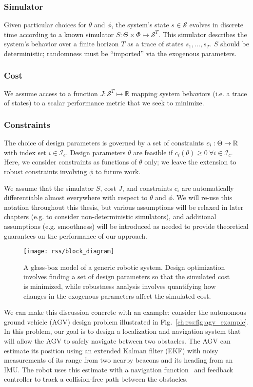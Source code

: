\subsubsection{Simulator} Given particular choices for $\theta$ and $\phi$, the system's state $s \in \mathcal{S}$ evolves in discrete time according to a known simulator $S : \Theta \times \Phi \mapsto \mathcal{S}^T$. This simulator describes the system's behavior over a finite horizon $T$ as a trace of states $s_1, \ldots, s_T$. $S$ should be deterministic; randomness must be ``imported'' via the exogenous parameters.
\subsubsection{Cost} We assume access to a function $J: \mathcal{S}^T \mapsto \mathbb{R}$ mapping system behaviors (i.e. a trace of states) to a scalar performance metric that we seek to minimize.
\subsubsection{Constraints} The choice of design parameters is governed by a set of constraints $c_i : \Theta \mapsto \mathbb{R}$ with index set $i \in \mathcal{I}_c$. Design parameters $\theta$ are feasible if $c_i(\theta) \geq 0 \ \forall i \in \mathcal{I}_c$. Here, we consider constraints as functions of $\theta$ only; we leave the extension to robust constraints involving $\phi$ to future work.

We assume that the simulator $S$, cost $J$, and constraints $c_i$ are automatically differentiable almost everywhere with respect to $\theta$ and $\phi$. We will re-use this notation throughout this thesis, but various assumptions will be relaxed in later chapters (e.g. to consider non-deterministic simulators), and additional assumptions (e.g. smoothness) will be introduced as needed to provide theoretical guarantees on the performance of our approach.

\begin{figure}[t!]
    \centering
    \texttt{[image: rss/block\_diagram]}
    \caption{A glass-box model of a generic robotic system. Design optimization involves finding a set of design parameters so that the simulated cost is minimized, while robustness analysis involves quantifying how changes in the exogenous parameters affect the simulated cost.}
    \label{ch:rss:fig:block_diagram}
\end{figure}

We can make this discussion concrete with an example: consider the autonomous ground vehicle (AGV) design problem illustrated in Fig.~\ref{ch:rss:fig:agv_example}. In this problem, our goal is to design a localization and navigation system that will allow the AGV to safely navigate between two obstacles. The AGV can estimate its position using an extended Kalman filter (EKF) with noisy measurements of its range from two nearby beacons and its heading from an IMU. The robot uses this estimate with a navigation function~\cite{aiama} and feedback controller to track a collision-free path between the obstacles.

